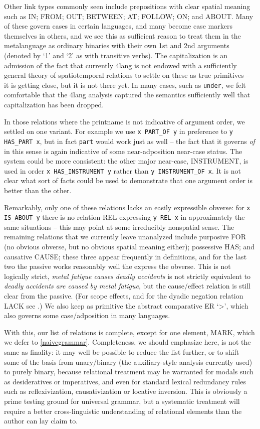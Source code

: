 \documentclass[11pt,bookmarks,bookmarksnumbered,naturalnames,plainpages=false,pdftex,colorlinks=true,urlcolor=blue,bookmarksdepth=subsection,plainpages=false]{paper}
\begin{document}
Other link types commonly seen include prepositions with clear spatial meaning
such as IN; FROM; OUT; BETWEEN; AT; FOLLOW; ON; and ABOUT. Many of these
govern cases in certain languages, and many become case markers themselves in
others, and we see this as sufficient reason to treat them in the metalanguage
as ordinary binaries with their own 1st and 2nd arguments (denoted by `1' and
`2' as with transitive verbs). The capitalization is an admission of the fact
that currently 4lang is not endowed with a sufficiently general theory of
spatiotemporal relations to settle on these as true primitives -- it is
getting close, but it is not there yet. In many cases, such as {\tt under}, we
felt comfortable that the 4lang analysis captured the semantics sufficiently
well that capitalization has been dropped.

In those relations where the printname is not indicative of argument order, we
settled on one variant. For example we use {\tt x PART\_OF y} in preference to
{\tt y HAS\_PART x}, but in fact {\tt part} would work just as well -- the
fact that it governs {\it of} in this sense is again indicative of some
near-adposition near-case status. The system could be more consistent: the
other major near-case, INSTRUMENT, is used in order {\tt x HAS\_INSTRUMENT y}
rather than {\tt y INSTRUMENT\_OF x}. It is not clear what sort of facts could
be used to demonstrate that one argument order is better than the other.

Remarkably, only one of these relations lacks an easily expressible obverse:
for {\tt x IS\_ABOUT y} there is no relation REL expressing {\tt y REL x} in
approximately the same situations -- this may point at some irreducibly
nonspatial sense. The remaining relations that we currently leave unanalyzed
include purposive FOR (no obvious obverse, but no obvious spatial meaning
either); possessive HAS; and causative CAUSE; these three appear frequently in
definitions, and for the last two the passive works reasonably well the
express the obverse. This is not logically strict, {\it metal fatigue causes
  deadly accidents} is not strictly equivalent to {\it deadly accidents are
  caused by metal fatigue}, but the cause/effect relation is still clear from
the passive. (For scope effects, and for the dyadic negation relation LACK see
\cite{Kornai:2020a}.) We also keep as primitive the abstract comparative ER
`>', which also governs some case/adposition in many languages.

With this, our list of relations is complete, except for one element, MARK,
which we defer to \ref{naivegrammar}. Completeness, we should emphasize here,
is not the same as finality: it may well be possible to reduce the list
further, or to shift some of the basis from unary/binary (the auxiliary-style
analysis currently used) to purely binary, because relational treatment may be
warranted for modals such as desideratives or imperatives, and even for
standard lexical redundancy rules such as reflexivization, causativization or
locative inversion. This is obviously a prime testing ground for universal
grammar, but a systematic treatment will require a better cross-linguistic
understanding of relational elements than the author can lay claim to.
\end{document}

